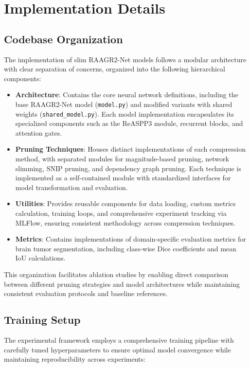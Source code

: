 \documentclass[12pt,a4paper]{article}
\begin{document}
\section{Implementation Details}

\subsection{Codebase Organization}
The implementation of slim RAAGR2-Net models follows a modular architecture with clear separation of concerns, organized into the following hierarchical components:

\begin{itemize}
    \item \textbf{Architecture}: Contains the core neural network definitions, including the base RAAGR2-Net model (\texttt{model.py}) and modified variants with shared weights (\texttt{shared\_model.py}). Each model implementation encapsulates its specialized components such as the ReASPP3 module, recurrent blocks, and attention gates.
    
    \item \textbf{Pruning Techniques}: Houses distinct implementations of each compression method, with separated modules for magnitude-based pruning, network slimming, SNIP pruning, and dependency graph pruning. Each technique is implemented as a self-contained module with standardized interfaces for model transformation and evaluation.
    
    \item \textbf{Utilities}: Provides reusable components for data loading, custom metrics calculation, training loops, and comprehensive experiment tracking via MLFlow, ensuring consistent methodology across compression techniques.
    
    \item \textbf{Metrics}: Contains implementations of domain-specific evaluation metrics for brain tumor segmentation, including class-wise Dice coefficients and mean IoU calculations.
\end{itemize}

This organization facilitates ablation studies by enabling direct comparison between different pruning strategies and model architectures while maintaining consistent evaluation protocols and baseline references.

\subsection{Training Setup}
The experimental framework employs a comprehensive training pipeline with carefully tuned hyperparameters to ensure optimal model convergence while maintaining reproducibility across experiments:
\end{document}

